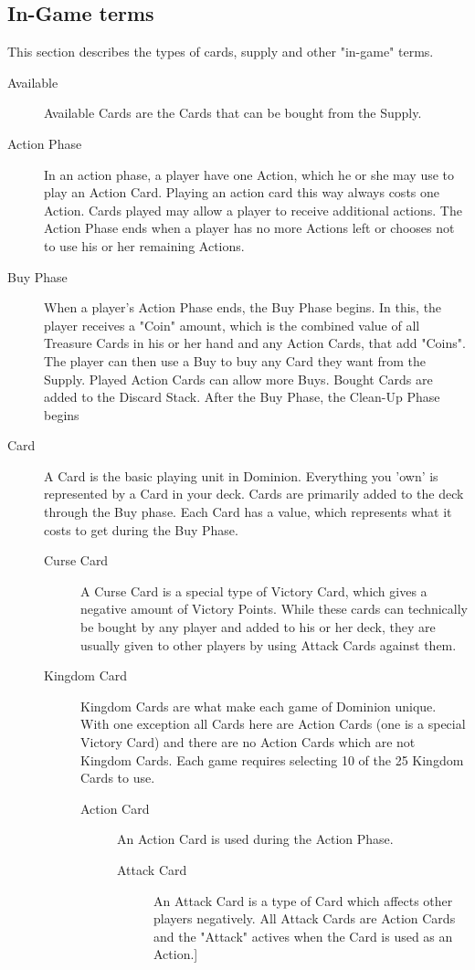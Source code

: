 \subsection{In-Game terms}
This section describes the types of cards, supply and other "in-game" terms.
\begin{description}
\item[Available] Available Cards are the Cards that can be bought from the Supply.
\item[Action Phase] In an action phase, a player have one Action, which he or she may use to play an Action Card. Playing an action card this way always costs one Action. Cards played may allow a player to receive additional actions. The Action Phase ends when a player has no more Actions left or chooses not to use his or her remaining Actions. 
\item[Buy Phase] When a player's Action Phase ends, the Buy Phase begins. In this, the player receives a "Coin" amount, which is the combined value of all Treasure Cards in his or her hand and any Action Cards, that add "Coins". The player can then use a Buy to buy any Card they want from the Supply. Played Action Cards can allow more Buys. Bought Cards are added to the Discard Stack. After the Buy Phase, the Clean-Up Phase begins
\item[Card] A Card is the basic playing unit in Dominion. Everything you 'own' is represented by a Card in your deck. Cards are primarily added to the deck through the Buy phase. Each Card has a value, which represents what it costs to get during the Buy Phase.
\begin{description}
\item[Curse Card] A Curse Card is a special type of Victory Card, which gives a negative amount of Victory Points. While these cards can technically be bought by any player and added to his or her deck, they are usually given to other players by using Attack Cards against them.
\item[Kingdom Card] Kingdom Cards are what make each game of Dominion unique. With one exception all Cards here are Action Cards (one is a special Victory Card) and there are no Action Cards which are not Kingdom Cards. Each game requires selecting 10 of the 25 Kingdom Cards to use.
\begin{description}
\item[Action Card] An Action Card is used during the Action Phase.
\begin{description}
\item[Attack Card] An Attack Card is a type of Card which affects other players negatively. All Attack Cards are Action Cards and the "Attack" actives when the Card is used as an Action.]

\end{description}
\end{description}
\end{description}
\end{description}
